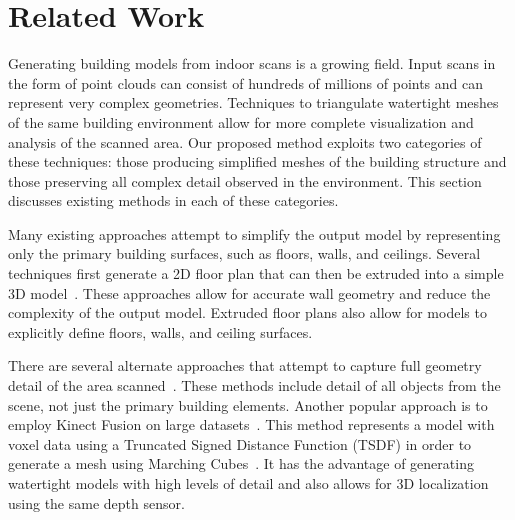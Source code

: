 \documentclass[review]{acmsiggraph}
\begin{document}
\section{Related Work}
\label{sec:background}

Generating building models from indoor scans is a growing field.  Input scans in the form of point clouds can consist of hundreds of millions of points and can represent very complex geometries.  Techniques to triangulate watertight meshes of the same building environment allow for more complete visualization and analysis of the scanned area.  Our proposed method exploits two categories of these techniques: those producing simplified meshes of the building structure and those preserving all complex detail observed in the environment.  This section discusses existing methods in each of these categories.

Many existing approaches attempt to simplify the output model by representing only the primary building surfaces, such as floors, walls, and ceilings.  Several techniques first generate a 2D floor plan that can then be extruded into a simple 3D model~\cite{Mura14,Turner14,Cabral14}.  These approaches allow for accurate wall geometry and reduce the complexity of the output model. Extruded floor plans also allow for models to explicitly define floors, walls, and ceiling surfaces.

There are several alternate approaches that attempt to capture full geometry detail of the area scanned~\cite{Pons10,Carving,Turner13}.  These methods include detail of all objects from the scene, not just the primary building elements.  Another popular approach is to employ Kinect Fusion on large datasets~\cite{Kintinuous,Zhou13}.  This method represents a model with voxel data using a Truncated Signed Distance Function (TSDF) in order to generate a mesh using Marching Cubes~\cite{MarchingCubes}.  It has the advantage of generating watertight models with high levels of detail and also allows for 3D localization using the same depth sensor.  
\end{document}
